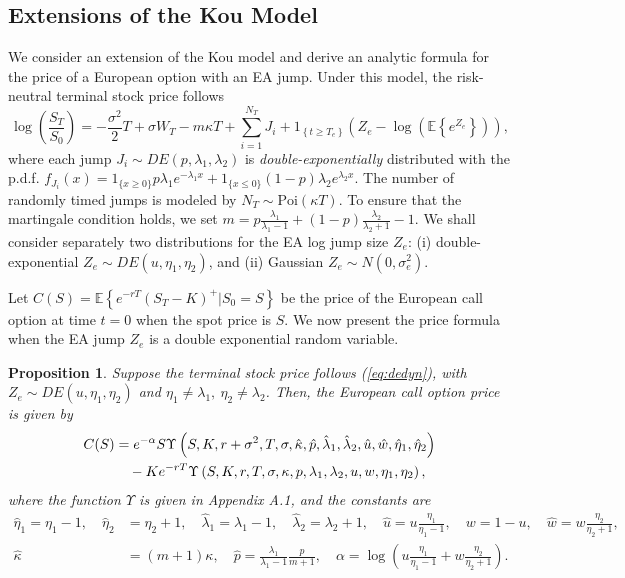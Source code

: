 \documentclass[11pt]{article}
\newtheorem{prop}[theorem]{Proposition}
\numberwithin{equation}{section}
\numberwithin{theorem}{section}
\begin{document}
\subsection{Extensions of the Kou Model\label{sub:KOU}}
We consider an extension of the Kou model and derive an
analytic formula for the price of a European option with an EA jump. Under this model, the risk-neutral terminal stock price follows
\begin{equation}
{\log}\left(\frac{S_{T}}{S_{0}}\right)=-\frac{\sigma^{2}}{2}T+\sigma W_{T}-m \kappa  T+\sum_{i=1}^{N_{T}}J_{i}+1_{\left\{ t\geq T_{e}\right\} }\left(Z_{e}-{\log}\left(\mathbb{E}\left\{ e^{Z_{e}}\right\} \right)\right),\label{eq:dedyn}
\end{equation}
where each jump $J_{i}\sim DE\left(p,\lambda_{1},\lambda_{2}\right)$ is  \textit{double-exponentially} distributed with the p.d.f.
$f_{J_{i}}\left(x\right)=1_{\{x\geq 0\}} p \lambda_{1}e^{-\lambda_{1}x}+1_{\{x\leq 0\}}\left(1-p\right)\lambda_{2}e^{\lambda_{2}x}$. The number of randomly timed jumps is modeled by 
$N_T \sim \text{Poi}(\kappa T)$. To ensure that the martingale condition holds,  we set  $m=p\frac{\lambda_{1}}{\lambda_{1}-1}+(1-p)\frac{\lambda_{2}}{\lambda_{2}+1}-1$.
 We shall consider separately two distributions for the  EA log jump size $Z_{e}$: (i) double-exponential $Z_{e}\sim DE\left(u,\eta_{1},\eta_{2}\right)$, and (ii)  Gaussian $Z_{e}\sim N\left(0,\sigma_{e}^{2}\right)$. 

Let $C\left(S\right)=\mathbb{E}\left\{ e^{-rT}\left(S_{T}-K\right)^{+}\vert S_{0}=S\right\} $
be the price of the European call option at time $t=0$ when the spot
price is   $S$. We now present the price  formula  when the EA jump $Z_e$  is a double exponential random variable.
\begin{prop}
\label{prop:KOU_extension}Suppose the terminal stock price  follows
(\ref{eq:dedyn}), with $Z_{e}\sim DE\left(u,\eta_{1},\eta_{2}\right)$
and $\eta_{1}\neq\lambda_{1},\ \eta_{2}\neq\lambda_{2}$. Then, the European call option price   is given by 
\begin{align}
C(S)&=e^{-\alpha}S\Upsilon\left(S,K,r+\sigma^{2},T,\sigma,\hat{\kappa},\hat{p},\hat{\lambda}_{1},\hat{\lambda}_{2},\hat{u},\hat{w},\hat{\eta}_{1},\hat{\eta}_{2}\right)\notag\\
&\quad  -Ke^{-rT}\Upsilon\left(S,K,r,T,\sigma,\kappa,p,\lambda_{1},\lambda_{2},u,w,\eta_{1},\eta_{2}\right),\label{eq:KOU_extension_formulae}
\end{align}
 where the function $\Upsilon$ is given in Appendix A.1, and  the constants  are
\begin{align*}
\hat{\eta}_{1}=\eta_{1}-1,\quad\hat{\eta}_{2}&=\eta_{2}+1,\quad
\hat{\lambda}_{1}=\lambda_{1}-1  ,\quad\hat{\lambda}_{2}=\lambda_{2}+1, \quad \hat{u}=u\frac{\eta_{1}}{\eta_{1}-1}  ,\quad w=1-u, \quad \hat{w}=w\frac{\eta_{2}}{\eta_{2}+1}, \\  \hat{\kappa}&=\left(m+1\right)\kappa,\quad\hat{p}=\frac{\lambda_{1}}{\lambda_{1}-1}\frac{p}{m+1}, \quad 
\alpha={\log}\left(u\frac{\eta_{1}}{\eta_{1}-1}+w\frac{\eta_{2}}{\eta_{2}+1}\right).
\end{align*}
\end{prop}
\end{document}
